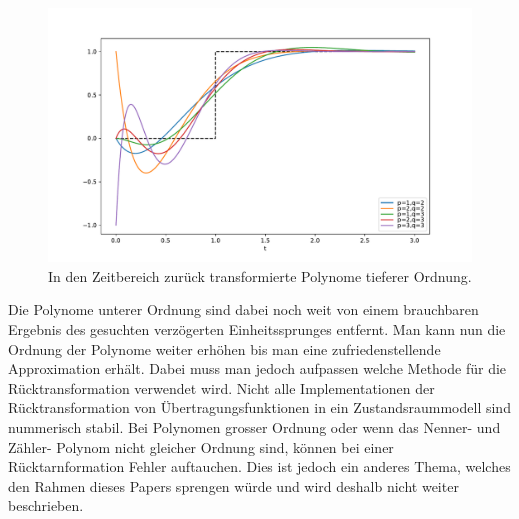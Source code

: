 \begin{figure}[!h]
	\centering
	\includegraphics[width=1\linewidth]{./papers/pade/python/bilder/padelow33.pdf}
	\caption{In den Zeitbereich zurück transformierte Polynome tieferer Ordnung\label{pade:totzeitexp2}.}
\end{figure}

Die Polynome unterer Ordnung sind dabei noch weit von einem brauchbaren Ergebnis des gesuchten verzögerten Einheitssprunges entfernt.
Man kann nun die Ordnung der Polynome weiter erhöhen bis man eine zufriedenstellende Approximation erhält.
Dabei muss man jedoch aufpassen welche Methode für die Rücktransformation verwendet wird.
Nicht alle Implementationen der Rücktransformation von Übertragungsfunktionen in ein Zustandsraummodell sind nummerisch stabil. 
Bei Polynomen grosser Ordnung oder wenn das Nenner- und Zähler- Polynom nicht gleicher Ordnung sind, können bei einer Rücktarnformation Fehler auftauchen.
Dies ist jedoch ein anderes Thema, welches den Rahmen dieses Papers sprengen würde und wird deshalb nicht weiter beschrieben.


